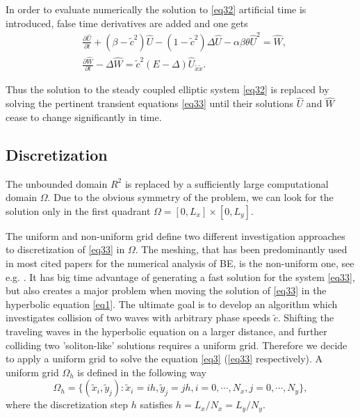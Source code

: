 \documentclass[12pt]{article}
\theoremstyle{theorem}
\theoremstyle{defi}
\begin{document}
In order to evaluate numerically the solution to \eqref{eq32} artificial time is introduced, false time derivatives are added and one gets
\begin{equation}\label{eq33}
\begin{split}
&\frac {\partial \widehat{U}}{\partial t} + (\beta-\tilde c^2) \widehat{U} - (1-\tilde c^2 ) \Delta \widehat{U} - \alpha \beta \theta \widehat{U}^2 = \widehat{W}, \\
&\frac {\partial \widehat{W}}{\partial t} - \Delta \widehat{W} =\tilde c^2 (E- \Delta) \widehat{U}_{\tilde x \tilde x}.
\end{split}
\end{equation}

Thus the solution to the steady coupled elliptic system \eqref{eq32} is replaced by solving the pertinent transient equations \eqref{eq33} until their solutions $\widehat{U}$ and $\widehat{W}$ cease to change significantly in time.

\subsection{Discretization}

The unbounded domain $R^2$ is replaced by a sufficiently large computational domain $\Omega$. Due to the obvious symmetry of the problem, we can look for the solution only in the first quadrant $\Omega = [0,L_x] \times[0,L_y]$.

The uniform and non-uniform grid define two different investigation approaches to discretization of \eqref{eq33} in $\Omega$. The meshing, that has been predominantly used in most cited papers for the numerical analysis of BE, is the non-uniform one, see e.g. \cite{ref6}. It has big time advantage of generating a fast solution for the system \eqref{eq33}, but also creates a major problem when moving the solution of \eqref{eq33} in the hyperbolic equation \eqref{eq1}. The ultimate goal is to develop an algorithm which investigates collision of two waves with arbitrary phase speeds $\tilde c$. Shifting the traveling waves in the hyperbolic equation on a larger distance, and further colliding two 'soliton-like' solutions requires a uniform grid. Therefore we decide to apply a uniform grid to solve the equation \eqref{eq3} (\eqref{eq33} respectively).
A uniform grid $\Omega_h$ is defined in the following way
$$
\Omega_h = \{(\tilde x_i, \tilde y_j): \tilde x_i = ih, \tilde y_j = jh, i = 0,\cdots ,N_x, j = 0,\cdots , N_y \},
$$
where the discretization step $h$ satisfies
$ h = L_x/N_x = L_y/N_y$.
\end{document}
